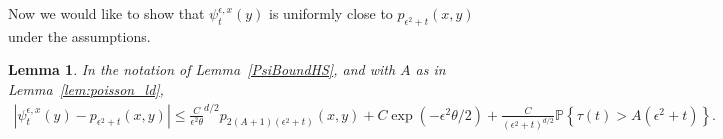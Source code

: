 \documentclass[12pt]{article}
\newtheorem{lemma}[theorem]{Lemma}
\newcommand{\IP}{\mathbb P}
\begin{document}
Now we would like to show that $\psi_t^{\epsilon,x}(y)$
is uniformly close to $p_{\epsilon^2 + t}(x, y)$
under the assumptions.

\begin{lemma}
    \label{Lemma:BoundPsiHS2}
    In the notation of Lemma~\ref{PsiBoundHS},
    and with $A$ as in Lemma~\ref{lem:poisson_ld},
    \begin{align*}
        \left|
            \psi_t^{\epsilon, x}(y)
            -
            p_{\epsilon^2 + t}(x, y)
        \right|
        \le
        \frac{C}{\epsilon^2 \theta}^{d/2}
        p_{2(A+1)(\epsilon^2+t)}(x, y)
        +
        C \exp(- \epsilon^2 \theta / 2)
        +
        \frac{C}{(\epsilon^2 + t)^{d/2}}
        \IP\left\{
            \tau(t) > A(\epsilon^2 + t)
        \right\} .
    \end{align*}
\end{lemma}
\end{document}
